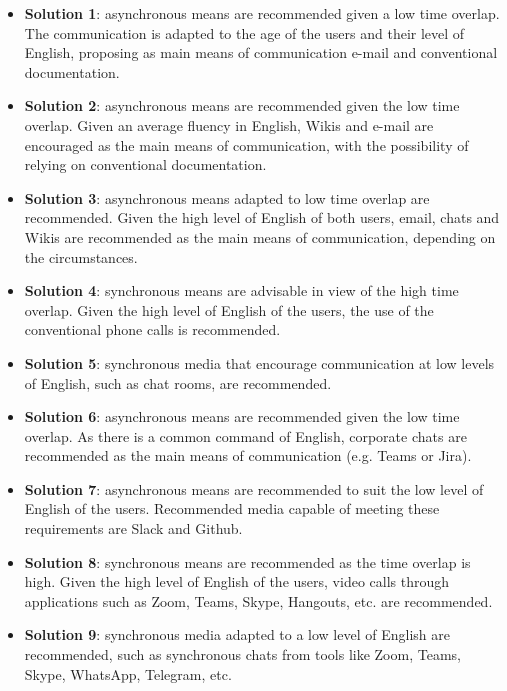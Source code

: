 \begin{itemize}

\item \textbf{Solution 1}: asynchronous means are recommended given a low time overlap. The communication is adapted to the age of the users and their level of English, proposing as main means of communication e-mail and conventional documentation.\newline

\item \textbf{Solution 2}: asynchronous means are recommended given the low time overlap. Given an average fluency in English, Wikis and e-mail are encouraged as the main means of communication, with the possibility of relying on conventional documentation.\newline

\item \textbf{Solution 3}: asynchronous means adapted to low time overlap are recommended. Given the high level of English of both users, email, chats and Wikis are recommended as the main means of communication, depending on the circumstances.\newline

\item \textbf{Solution 4}: synchronous means are advisable in view of the high time overlap. Given the high level of English of the users, the use of the conventional phone calls is recommended.\newline

\item \textbf{Solution 5}: synchronous media that encourage communication at low levels of English, such as chat rooms, are recommended.\newline

\item \textbf{Solution 6}: asynchronous means are recommended given the low time overlap. As there is a common command of English, corporate chats are recommended as the main means of communication (e.g. Teams or Jira).\newline

\item \textbf{Solution 7}: asynchronous means are recommended to suit the low level of English of the users. Recommended media capable of meeting these requirements are Slack and Github.\newline

\item \textbf{Solution 8}: synchronous means are recommended as the time overlap is high. Given the high level of English of the users, video calls through applications such as Zoom, Teams, Skype, Hangouts, etc. are recommended.\newline

\item \textbf{Solution 9}: synchronous media adapted to a low level of English are recommended, such as synchronous chats from tools like Zoom, Teams, Skype, WhatsApp, Telegram, etc.\newline

\end{itemize}

